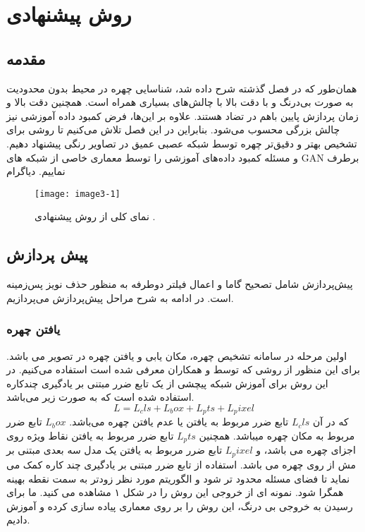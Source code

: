 \chapter{ روش پیشنهادی }
\section{مقدمه}

همان‌طور که در فصل‌ گذشته شرح داده شد، شناسایی چهره در محیط بدون محدودیت به صورت بی‌درنگ و با دقت بالا با چالش‌های بسیاری همراه است. همچنین دقت بالا و زمان پردازش پایین باهم در تضاد هستند. علاوه بر این‌ها، فرض ‌کمبود داده آموزشی نیز چالش بزرگی محسوب می‌شود. بنابراین در این فصل تلاش می‌کنیم تا روشی برای تشخیص بهتر و دقیق‌تر چهره توسط شبکه عصبی عمیق در تصاویر رنگی پیشنهاد دهیم. و مسئله کمبود داده‌های آموزشی را توسط معماری خاصی از شبکه های GAN برطرف نماییم.
\noindent
دیاگرام
\begin{figure}[h]
\centering
  \texttt{[image: image3-1]}
  \caption{نمای کلی از روش پیشنهادی \cite{ref1}.}
  \label{image2-1}
\end{figure}

\section{پیش پردازش}
پیش‌پردازش شامل تصحیح گاما و اعمال فیلتر دوطرفه به منظور حذف نویز پس‌زمینه است. در ادامه به شرح مراحل پیش‌پردازش می‌پردازیم.
\subsection{یافتن چهره}
اولین مرحله در سامانه تشخیص چهره، مکان یابی و یافتن چهره در تصویر می باشد. برای این منظور از روشی که توسط  و همکاران \cite{deng2019retinaface} معرفی شده است استفاده می‌کنیم. در این روش برای آموزش شبکه پیچشی از یک تابع ضرر مبتنی بر یادگیری چندکاره استفاده شده است که به صورت زیر می‌باشد.
 \begin{equation}\label{eq3-2}
L = L_cls + L_box + L_pts + L_pixel  
\end{equation}
\noindent
که در آن
$L_cls$
تابع ضرر مربوط به یافتن یا عدم یافتن چهره می‌باشد.
$L_box$
تابع ضرر مربوط به مکان چهره میباشد. همچنین
$L_pts$
تابع ضرر مربوط به یافتن نقاط ویژه روی اجزای چهره می باشد، و
$L_pixel$
تابع ضرر مربوط به یافتن یک مدل سه بعدی مبتنی بر مش از روی چهره می باشد. استفاده از تابع ضرر مبتنی بر یادگیری چند کاره کمک می نماید تا فضای مسئله محدود تر شود و الگوریتم مورد نظر زودتر به سمت نقطه بهینه همگرا شود. نمونه ای از خروجی این روش را در شکل ۱ مشاهده می کنید. ما برای رسیدن به خروجی بی درنگ، این روش را بر روی معماری  پیاده سازی کرده و آموزش دادیم.  

